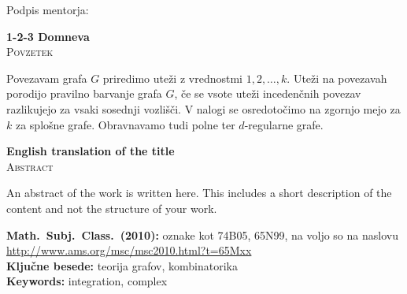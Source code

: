\documentclass[12pt,a4paper,twoside]{article}
\newcommand{\naslovdela}{1-2-3 Domneva}
\newcommand{\kljucnebesede}{teorija grafov\sep kombinatorika} %
\newcommand{\keywords}{integration\sep complex} %
\newcommand{\sep}{, }  %
\theoremstyle{definition} %
\theoremstyle{plain} %
\numberwithin{equation}{section}  %
\begin{document}
\vspace{2cm}
\hspace*{\fill} Podpis mentorja: \phantom{prostor za podpis}


\cleardoublepage
{}

\begin{center}
\textbf{\naslovdela} \\[3mm]
\textsc{Povzetek} \\[2mm]
\end{center}
Povezavam grafa $G$ priredimo uteži z vrednostmi $1,2,\ldots,k$. Uteži na povezavah porodijo pravilno barvanje grafa $G$, če se vsote uteži incedenčnih povezav razlikujejo za vsaki sosednji vozlišči. V nalogi se osredotočimo na zgornjo mejo za $k$ za splošne grafe. Obravnavamo tudi polne ter $d$-regularne grafe. 

\vfill
\begin{center}
\textbf{English translation of the title} \\[3mm] %
\textsc{Abstract}\\[2mm]
\end{center}

An abstract of the work is written here. This includes a short description of
the content and not the structure of your work.

\vfill\noindent
\textbf{Math.~Subj.~Class.~(2010):} oznake kot 74B05, 65N99, na voljo so na naslovu
\url{http://www.ams.org/msc/msc2010.html?t=65Mxx} \\[1mm]
\textbf{Ključne besede:} \kljucnebesede \\[1mm]
\textbf{Keywords:} \keywords

\cleardoublepage

\setcounter{page}{1}    %
\end{document}
